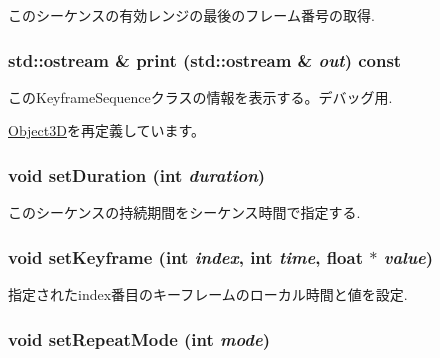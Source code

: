 このシーケンスの有効レンジの最後のフレーム番号の取得. \hypertarget{classm3g_1_1KeyframeSequence_6fea17fa1532df3794f8cb39cb4f911f}{
\subsubsection[{print}]{\setlength{\rightskip}{0pt plus 5cm}std::ostream \& print (std::ostream \& {\em out}) const}}
\label{classm3g_1_1KeyframeSequence_6fea17fa1532df3794f8cb39cb4f911f}


このKeyframeSequenceクラスの情報を表示する。デバッグ用. 

\hyperlink{classm3g_1_1Object3D_6fea17fa1532df3794f8cb39cb4f911f}{Object3D}を再定義しています。\hypertarget{classm3g_1_1KeyframeSequence_d7406d5e0e2f398e05e3563d099dfdf1}{
\subsubsection[{setDuration}]{\setlength{\rightskip}{0pt plus 5cm}void setDuration (int {\em duration})}}
\label{classm3g_1_1KeyframeSequence_d7406d5e0e2f398e05e3563d099dfdf1}


このシーケンスの持続期間をシーケンス時間で指定する. \hypertarget{classm3g_1_1KeyframeSequence_700d02a4ac28514016721e4b1d2bcf96}{
\subsubsection[{setKeyframe}]{\setlength{\rightskip}{0pt plus 5cm}void setKeyframe (int {\em index}, \/  int {\em time}, \/  float $\ast$ {\em value})}}
\label{classm3g_1_1KeyframeSequence_700d02a4ac28514016721e4b1d2bcf96}


指定されたindex番目のキーフレームのローカル時間と値を設定. \hypertarget{classm3g_1_1KeyframeSequence_e5cd1486fe0a8a61cf96816e976d7f87}{
\subsubsection[{setRepeatMode}]{\setlength{\rightskip}{0pt plus 5cm}void setRepeatMode (int {\em mode})}}
\label{classm3g_1_1KeyframeSequence_e5cd1486fe0a8a61cf96816e976d7f87}


